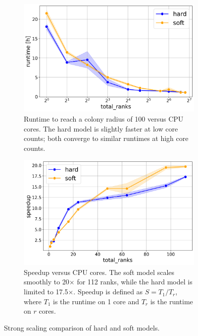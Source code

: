 \documentclass[conference]{IEEEtran}
\begin{document}
\begin{figure}[H]
    \centering
    \begin{subfigure}[b]{1\linewidth}
        \includegraphics[width=\linewidth]{figures/runtimes/strong_scaling_runtime_hard_soft.png}
        \caption{Runtime to reach a colony radius of 100 versus CPU cores. The hard model is slightly faster at low core counts; both converge to similar runtimes at high core counts.}
        \label{fig:runtime_hard_soft}
    \end{subfigure}

    \begin{subfigure}[b]{1\linewidth}
        \includegraphics[width=\linewidth]{figures/runtimes/strong_scaling_speedup_hard_soft.png}
        \caption{Speedup versus CPU cores. The soft model scales smoothly to 20$\times$ for 112 ranks, while the hard model is limited to 17.5$\times$. Speedup is defined as $S = T_1 / T_r$, where $T_1$ is the runtime on 1 core and $T_r$ is the runtime on $r$ cores.}
        \label{fig:speedup_hard_soft}
    \end{subfigure}

    \caption{Strong scaling comparison of hard and soft models.}
\end{figure}
\end{document}
